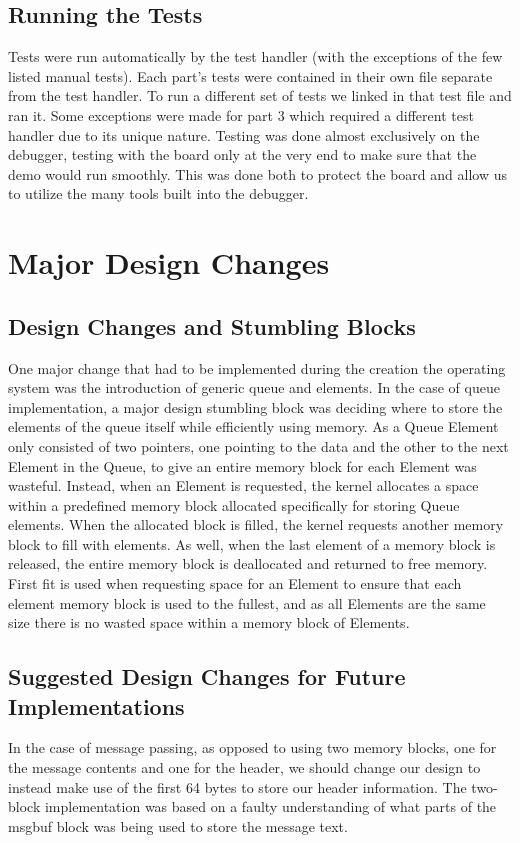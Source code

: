 \documentclass[11pt, oneside]{article}
\begin{document}
\subsection{Running the Tests} Tests were run automatically by the test handler (with the exceptions of the few listed manual tests). Each part's tests were contained in their own file separate from the test handler. To run a different set of tests we linked in that test file and ran it. Some exceptions were made for part 3 which required a different test handler due to its unique nature. Testing was done almost exclusively on the debugger, testing with the board only at the very end to make sure that the demo would run smoothly. This was done both to protect the board and allow us to utilize the many tools built into the debugger.


\section{Major Design Changes}

\subsection {Design Changes and Stumbling Blocks}
One major change that had to be implemented during the creation the operating system was the introduction of generic queue and elements. In the case of queue implementation, a major design stumbling block was deciding where to store the elements of the queue itself while efficiently using memory. As a Queue Element only consisted of two pointers, one pointing to the data and the other to the next Element in the Queue, to give an entire memory block for each Element was wasteful. Instead, when an Element is requested, the kernel allocates a space within a predefined memory block allocated specifically for storing Queue elements. When the allocated block is filled, the kernel requests another memory block to fill with elements. As well, when the last element of a memory block is released, the entire memory block is deallocated and returned to free memory. First fit is used when requesting space for an Element to ensure that each element memory block is used to the fullest, and as all Elements are the same size there is no wasted space within a memory block of Elements.

\subsection {Suggested Design Changes for Future Implementations}
In the case of message passing, as opposed to using two memory blocks, one for the message contents and one for the header, we should change our design to instead make use of the first 64 bytes to store our header information. The two-block implementation  was based on a faulty understanding of what parts of the msgbuf block was being used to store the message text.
\end{document}
